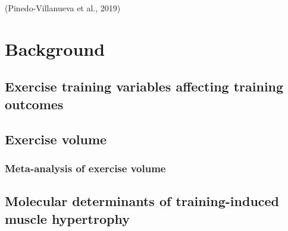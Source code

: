 \documentclass[twoside,10pt]{gihclass} %
\begin{document}
(Pinedo-Villanueva et al., 2019)

\hypertarget{background}{%
\chapter{Background}\label{background}}

\hypertarget{exercise-training-variables-affecting-training-outcomes}{%
\section{Exercise training variables affecting training outcomes}\label{exercise-training-variables-affecting-training-outcomes}}

\hypertarget{exercise-volume}{%
\section{Exercise volume}\label{exercise-volume}}

\hypertarget{meta-analysis-of-exercise-volume}{%
\subsection{Meta-analysis of exercise volume}\label{meta-analysis-of-exercise-volume}}

\hypertarget{molecular-determinants-of-training-induced-muscle-hypertrophy}{%
\section{Molecular determinants of training-induced muscle hypertrophy}\label{molecular-determinants-of-training-induced-muscle-hypertrophy}}
\end{document}

